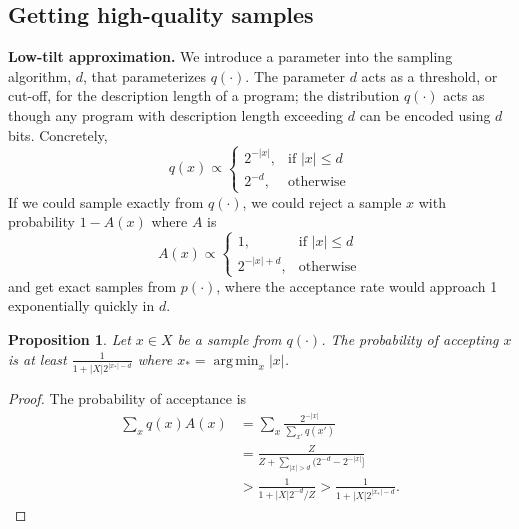 \documentclass{article}
\DeclareMathOperator*{\argmin}{arg\,min} %
\DeclareMathOperator*{\argmin}{argmin} %
\DeclareMathOperator{\argmin}{arg\,min} %
\DeclareMathOperator{\argmin}{argmin} %
\newtheorem{proposition}{Proposition}
\begin{document}
\subsection{Getting high-quality samples}
\textbf{Low-tilt approximation.}
We introduce a parameter into the sampling algorithm, $d$, that parameterizes $q(\cdot )$.
The parameter $d$ acts as a threshold, or cut-off, for the description length of a program;
the distribution $q(\cdot )$ acts as though any program with description length exceeding $d$ can be encoded using $d$ bits. Concretely,
\begin{equation}
  q(x) \propto \begin{cases}
    2^{-|x|},& \text{if } |x|\leq d\\
    2^{-d},              & \text{otherwise}
\end{cases}
  \end{equation}
If we could sample exactly from $q(\cdot )$, we could reject a sample $x$ with probability $1-A(x)$ where $A$ is
\begin{equation}
  A(x) \propto \begin{cases}
    1,& \text{if } |x|\leq d\\
    2^{-|x|+d},              & \text{otherwise}
    \end{cases}
  \end{equation}
and get exact samples from $p(\cdot )$, where the acceptance rate would approach 1 exponentially quickly in $d$.
\begin{proposition}\label{acceptanceBound}
  Let $x\in X$ be a sample from $q(\cdot )$. The probability of accepting $x$ is at least $\frac{1}{1 + |X|2^{|x_*|-d}}$ where $x_* = \argmin_x |x|$.
\end{proposition}
\begin{proof}
  The probability of acceptance is
  \begin{align}
    \sum_x q(x) A(x)& = \sum_x \frac{2^{-|x|}}{\sum_{x'}q(x')}\\
    & = \frac{Z}{Z + \sum_{|x| > d}(2^{-d} - 2^{-|x|}] }\\
      & > \frac{1}{1 + |X|2^{-d}/Z}>\frac{1}{1 + |X|2^{|x_*|-d}}.
  \end{align}
\end{proof}
\end{document}
